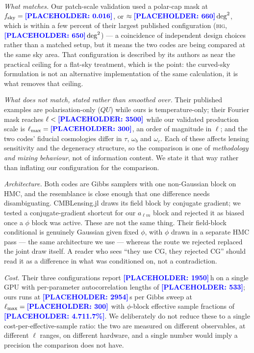 \documentclass[twocolumn,superscriptaddress,aps,prl,floatfix]{revtex4-2}
\newcommand{\alm}{a_{\ell m}}
\newcommand{\lmax}{\ell_{\max}}
\newcommand{\placeholder}[1]{\textcolor{blue}{\textbf{[PLACEHOLDER: #1]}}}
\begin{document}
\emph{What matches.} Our patch-scale validation used a polar-cap mask at
$f_{\rm sky} = \placeholder{0.016}$, or $\approx \placeholder{660}\,\mathrm{deg}^2$,
which is within a few percent of their largest published configuration
(\textsc{big}, $\placeholder{650}\,\mathrm{deg}^2$) --- a coincidence of
independent design choices rather than a matched setup, but it means the two
codes are being compared at the same sky area. That configuration is described
by its authors as near the practical ceiling for a flat-sky treatment, which is
the point: the curved-sky formulation is not an alternative implementation of
the same calculation, it is what removes that ceiling.

\emph{What does not match, stated rather than smoothed over.} Their published
examples are polarisation-only ($QU$) while ours is temperature-only; their
Fourier mask reaches $\ell < \placeholder{3500}$ while our validated production
scale is $\lmax = \placeholder{300}$, an order of magnitude in $\ell$; and the
two codes' fiducial cosmologies differ in $\tau$, $\omega_b$ and $\omega_c$.
Each of these affects lensing sensitivity and the degeneracy structure, so the
comparison is one of \emph{methodology and mixing behaviour}, not of information
content. We state it that way rather than inflating our configuration for the
comparison.

\emph{Architecture.} Both codes are Gibbs samplers with one non-Gaussian block
on HMC, and the resemblance is close enough that one difference needs
disambiguating. CMBLensing.jl draws its field block by conjugate gradient; we
tested a conjugate-gradient shortcut for our $\alm$ block and rejected it as
biased once a $\phi$ block was active. These are not the same thing. Their
field-block conditional is genuinely Gaussian given fixed $\phi$, with $\phi$
drawn in a separate HMC pass --- the same architecture we use --- whereas the
route we rejected replaced the joint draw itself. A reader who sees ``they use
CG, they rejected CG'' should read it as a difference in what was conditioned
on, not a contradiction.

\emph{Cost.} Their three configurations report
\placeholder{19\text{--}50}\,h on a single GPU with per-parameter
autocorrelation lengths of \placeholder{5\text{--}33}; ours runs at
\placeholder{29\text{--}54}\,s per Gibbs sweep at $\lmax = \placeholder{300}$
with $\phi$-block effective sample fractions of
\placeholder{4.7\text{--}11.7\%}. We deliberately do not reduce these to a
single cost-per-effective-sample ratio: the two are measured on different
observables, at different $\ell$ ranges, on different hardware, and a single
number would imply a precision the comparison does not have.
\end{document}
